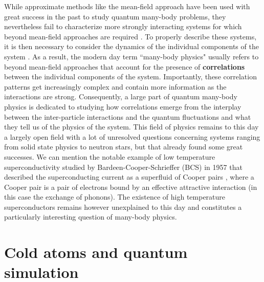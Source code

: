 While approximate methods like the mean-field approach have been used with great success in the past to study quantum many-body problems, they nevertheless fail to characterize more strongly interacting systems for which beyond mean-field approaches are required \cite{navon2010equation,lavoine2021,papp2008bragg}. To properly describe these systems, it is then necessary to consider the dynamics of the individual components of the system \cite{hodgman2017solving,schweigler2017experimental,wenz2013few}. As a result, the modern day term ``many-body physics" usually refers to beyond mean-field approaches that account for the presence of \textbf{correlations} between the individual components of the system. Importantly, these correlation patterns get increasingly complex and contain more information as the interactions are strong. Consequently, a large part of quantum many-body physics is dedicated to studying how correlations emerge from the interplay between the inter-particle interactions and the quantum fluctuations and what they tell us of the physics of the system. This field of physics remains to this day a largely open field with a lot of unresolved questions concerning systems ranging from solid state physics to neutron stars, but that already found some great successes. We can mention the notable example of low temperature superconductivity studied by Bardeen-Cooper-Schrieffer \cite{bardeen1957theory} (BCS) in 1957 that described the superconducting current as a superfluid of Cooper pairs \cite{cooper1956bound}, where a Cooper pair is a pair of electrons bound by an effective attractive interaction (in this case the exchange of phonons). The existence of high temperature superconductors remains however unexplained to this day and constitutes a particularly interesting question of many-body physics.

\section*{Cold atoms and quantum simulation}


